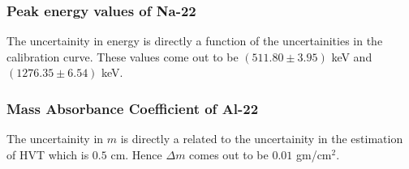 \subsubsection*{Peak energy values of Na-22}
The uncertainity in energy is directly a function of the uncertainities in the calibration curve. These values come out to be $(511.80 \pm 3.95)$ keV and $(1276.35 \pm 6.54)$ keV.

\subsubsection*{Mass Absorbance Coefficient of Al-22}
The uncertainity in $m$ is directly a related to the uncertainity in the estimation of HVT which is $0.5$ cm. Hence $\Delta m$ comes out to be $0.01$ gm/cm$^2$.